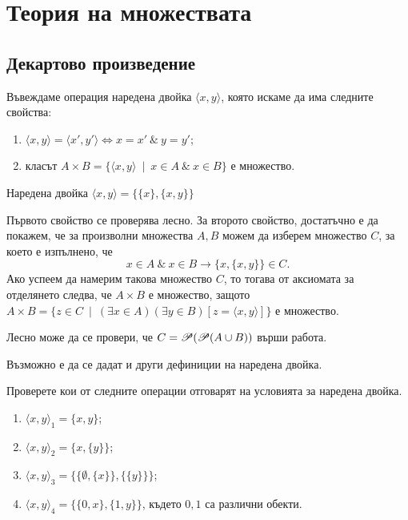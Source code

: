 \chapter{Теория на множествата}


\section{Декартово произведение}
  Въвеждаме операция наредена двойка $\langle{x,y}\rangle$, която искаме да има следните свойства:
  \begin{enumerate}
  \item
    $\langle{x,y}\rangle = \langle{x',y'}\rangle \iff x = x' \ \&\ y = y'$;
  \item
    класът $A\times B = \{\langle{x,y}\rangle\ \mid\ x\in A\ \&\ x\in B\}$ е множество.
\end{enumerate}


\begin{dfn}[Куратовски]
  Наредена двойка $\langle{x,y}\rangle = \{\{x\},\{x,y\}\}$
\end{dfn}

Първото свойство се проверява лесно.
За второто свойство, достатъчно е да покажем, че за произволни множества $A,B$ можем да 
изберем множество $C$, за което е изпълнено, че
\[x\in A\ \&\ x\in B \rightarrow \{x,\{x,y\}\}\in C.\]
Ако успеем да намерим такова множество $C$, то тогава от аксиомата за отделянето следва, че $A\times B$
е множество, защото $A\times B = \{ z\in C\ \mid\ (\exists x\in A)(\exists y\in B)[z = \langle{x,y}\rangle]\}$ е множество.

Лесно може да се провери, че $C = \mathscr{P}(\mathscr{P}(A\cup B))$ върши работа.

Възможно е да се дадат и други дефиниции на наредена двойка.
\begin{problem}
  Проверете кои от следните операции отговарят на условията за наредена двойка.
  \begin{enumerate}
  \item
    $\langle{x,y}\rangle_{1} = \{x,y\}$;
  \item
    $\langle{x,y}\rangle_{2} = \{x,\{y\}\}$;
  \item
    $\langle{x,y}\rangle_{3} = \{\{\emptyset,\{x\}\},\{\{y\}\}\}$;
  \item
    $\langle{x,y}\rangle_{4} = \{\{0,x\},\{1,y\}\}$, 
    където $0,1$ са различни обекти.
\end{enumerate}
\end{problem}



